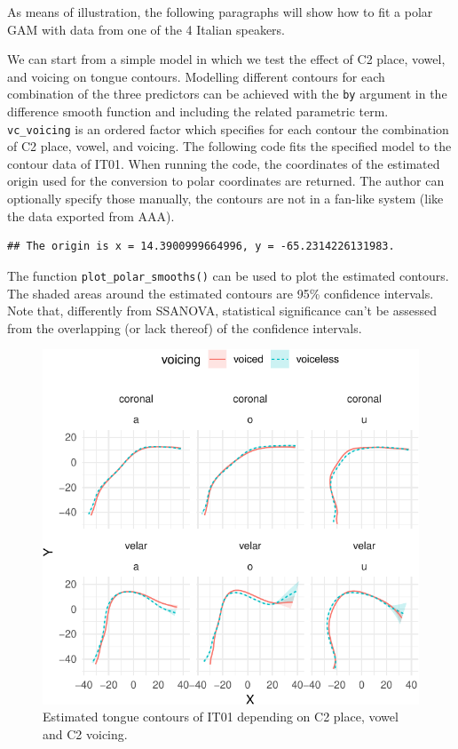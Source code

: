 \documentclass[12pt,]{article}
\begin{document}
As means of illustration, the following paragraphs will show how to fit
a polar GAM with data from one of the 4 Italian speakers.

We can start from a simple model in which we test the effect of C2
place, vowel, and voicing on tongue contours. Modelling different
contours for each combination of the three predictors can be achieved
with the \texttt{by} argument in the difference smooth function and
including the related parametric term. \texttt{vc\_voicing} is an
ordered factor which specifies for each contour the combination of C2
place, vowel, and voicing. The following code fits the specified model
to the contour data of IT01. When running the code, the coordinates of
the estimated origin used for the conversion to polar coordinates are
returned. The author can optionally specify those manually, the contours
are not in a fan-like system (like the data exported from AAA).

\begin{verbatim}
## The origin is x = 14.3900999664996, y = -65.2314226131983.
\end{verbatim}

The function \texttt{plot\_polar\_smooths()} can be used to plot the
estimated contours. The shaded areas around the estimated contours are
95\% confidence intervals. Note that, differently from SSANOVA,
statistical significance can't be assessed from the overlapping (or lack
thereof) of the confidence intervals.

\begin{figure}

{\centering \includegraphics[width=\linewidth]{2018-polar-gam_files/figure-latex/it01-gam-plot-1} 

}

\caption{Estimated tongue contours of IT01 depending on C2 place, vowel and C2 voicing.}\label{f:it01-gam-plot}
\end{figure}
\end{document}
